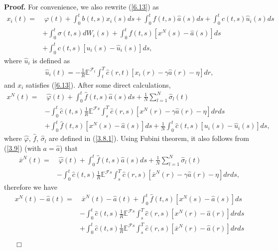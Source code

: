 \documentclass[11pt]{article}
\newenvironment{proof}[1][Proof]{\noindent \textbf{#1.} }{\ \ \  $\Box$}
\def\dbE{\mathbb{E}}
\begin{document}
\begin{proof}
For convenience, we also rewrite (\ref{6.13}) as
%
\begin{align}
x_{i}(t) = & \; \varphi (t)+\int_{0}^{t}b(t,s)x_{i}(s)ds+\int_{0}^{t}f(t,s)\widehat{a}(s)ds+\int_{0}^{t}c(t,s)\widehat{u}_{i}(s)ds \nonumber \\
& +\int_{0}^{t}\sigma (t,s)dW_{i}(s)+\int_{0}^{t}f(t,s)[x^{N}(s)-\widehat{a}(s)]ds \nonumber \\
& +\int_{0}^{t}c(t,s)[u_{i}(s)-\widehat{u}_{i}(s)]ds, \label{6.14}
\end{align}
%
where $\widehat{u}_i$ is defined as
\begin{eqnarray}\label{6.15}
\widehat{u}_{i}(t)=-\frac{1}{R}\dbE^{\mathcal{F}_{t}}\!\!\int_{t}^{T}\widehat{c}(r,t)[x_{i}(r)-\gamma \widehat{a}(r)-\eta ]dr,
\end{eqnarray}
%
and $x_{i}$ satisfies (\ref{6.13}). After some direct calculations,
%
\begin{align*}
x^{N}(t) = & \; \widehat{\varphi }(t)+\int_{0}^{t}\widehat{f}(t,s)\widehat{a}(s)ds+\frac{1}{N}\sum_{l=1}^{N}\widehat{\sigma }_{l}(t) \\
& -\int_{0}^{t}\widehat{c}(t,s)\frac{1}{R}\dbE^{\mathcal{F}s}\int_{s}^{T}\widehat{c}(r,s)[x^{N}(r)-\gamma \widehat{a}(r)-\eta ]drds \\
& +\int_{0}^{t}\widehat{f}(t,s)[x^{N}(s)-\widehat{a}(s)]ds+\frac{1}{N}\int_{0}^{t}\widehat{c}(t,s)[u_{i}(s)-\widehat{u}_{i}(s)]ds,
\end{align*}
%
where $\widehat{\varphi}$, $\widehat{f}$, $\widehat{\sigma}_l$ are
defined in (\ref{3.8.1}). Using Fubini theorem, it also follows from
(\ref{3.9}) (with $a=\widehat{a}$) that
%
\begin{align*}
\overline{x}^{N}(t) = & \; \widehat{\varphi }(t)+\int_{0}^{t}\widehat{f}(t,s)\widehat{a}(s)ds+\frac{1}{N}\sum_{l=1}^{N}\widehat{\sigma }_{l}(t) \\
&
-\int_{0}^{t}\widehat{c}(t,s)\frac{1}{R}\dbE^{\mathcal{F}s}\!\!\int_{s}^{T}\widehat{c}(r,s)[\overline{x}^{N}(r)-\gamma
\widehat{a}(r)-\eta ]drds,
\end{align*}
%
therefore we have
%
\begin{align}
x^{N}(t)-\widehat{a}(t) = & \; \overline{x}^{N}(t)-\widehat{a}(t)+\int_{0}^{t}\widehat{f}(t,s)[x^{N}(s)-\widehat{a}(s)]ds \nonumber \\
& -\int_{0}^{t}\widehat{c}(t,s)\frac{1}{R}\dbE^{\mathcal{F}s}\!\!\int_{s}^{T}\widehat{c}(r,s)[x^{N}(r)-\widehat{a}(r)]drds \nonumber \\
& +\int_{0}^{t}\widehat{c}(t,s)\frac{1}{R}\dbE^{\mathcal{F}s}\!\!\int_{s}^{T}\widehat{c}(r,s)[\overline{x}^{N}(r)-\widehat{a}(r)]drds \nonumber \\

\end{align}
\end{proof}
\end{document}
